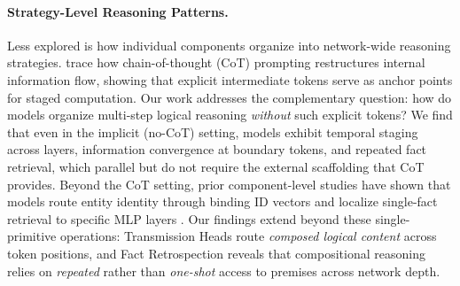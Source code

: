 \documentclass[11pt]{article}
\begin{document}
\paragraph{Strategy-Level Reasoning Patterns.}
Less explored is how individual components organize into network-wide reasoning strategies. \citet{dutta2024thinkstepbystep} trace how chain-of-thought (CoT) prompting restructures internal information flow, showing that explicit intermediate tokens serve as anchor points for staged computation. Our work addresses the complementary question: how do models organize multi-step logical reasoning \textit{without} such explicit tokens? We find that even in the implicit (no-CoT) setting, models exhibit temporal staging across layers, information convergence at boundary tokens, and repeated fact retrieval, which parallel but do not require the external scaffolding that CoT provides.
%
Beyond the CoT setting, prior component-level studies have shown that models route entity identity through binding ID vectors \citep{feng2024languagemodelsrepresent} and localize single-fact retrieval to specific MLP layers \citep{meng2023locatingeditingfactualassociations}. Our findings extend beyond these single-primitive operations: Transmission Heads route \textit{composed logical content} across token positions, and Fact Retrospection reveals that compositional reasoning relies on \textit{repeated} rather than \textit{one-shot} access to premises across network depth.
\end{document}

